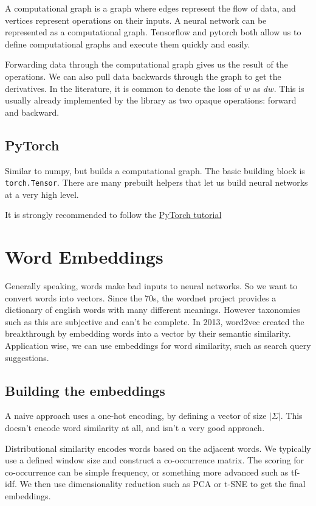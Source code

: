 \documentclass{idc_msc}
\begin{document}
A computational graph is a graph where edges represent the flow of data, and vertices represent operations on their inputs.
A neural network can be represented as a computational graph.
Tensorflow and pytorch both allow us to define computational graphs and execute them quickly and easily.

Forwarding data through the computational graph gives us the result of the operations.
We can also pull data backwards through the graph to get the derivatives.
In the literature, it is common to denote the loss of \(w\) as \(dw\).
This is usually already implemented by the library as two opaque operations: forward and backward.

\subsection{PyTorch}

Similar to numpy, but builds a computational graph.
The basic building block is \texttt{torch.Tensor}.
There are many prebuilt helpers that let us build neural networks at a very high level.

It is strongly recommended to follow the \href{https://colab.research.google.com/drive/1h425s_d-kP3Hja2E7EKEE8QSIpzamXM_}{PyTorch tutorial}

\section{Word Embeddings}

Generally speaking, words make bad inputs to neural networks.
So we want to convert words into vectors.
Since the 70s, the wordnet project provides a dictionary of english words with many different meanings.
However taxonomies such as this are subjective and can't be complete.
In 2013, word2vec created the breakthrough by embedding words into a vector by their semantic similarity.
Application wise, we can use embeddings for word similarity, such as search query suggestions.

\subsection{Building the embeddings}

A naive approach uses a one-hot encoding, by defining a vector of size \(|\Sigma|\).
This doesn't encode word similarity at all, and isn't a very good approach.

Distributional similarity encodes words based on the adjacent words.
We typically use a defined window size and construct a co-occurrence matrix.
The scoring for co-occurrence can be simple frequency, or something more advanced such as tf-idf.
We then use dimensionality reduction such as PCA or t-SNE to get the final embeddings.
\end{document}
